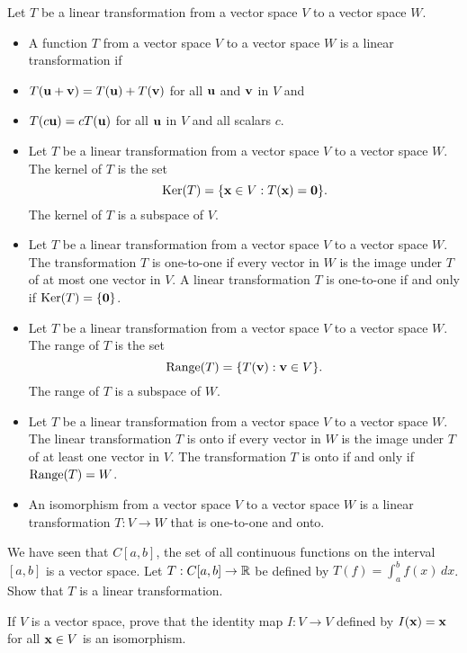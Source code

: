 \label{sec:lin_trans_summ}
Let $T$ be a linear transformation from a vector space $V$ to a vector space $W$. 
\begin{itemize}
\item A function $T$  from a vector space $V$ to a vector space $W$ is a linear transformation if 
	\be
	\item $T(\mathbf{u} + \mathbf{v}) = T(\mathbf{u}) + T(\mathbf{v})$ for all $\mathbf{u}$ and $\mathbf{v}$ in $V$ and
	\item $T(c\mathbf{u}) = cT(\mathbf{u})$ for all $\mathbf{u}$ in $V$ and all scalars $c$.
	\ee
\item Let $T$ be a linear transformation from a vector space $V$ to a vector space $W$. The kernel of $T$ is the set
\[\text{Ker}(T) = \{\mathbf{x} \in V : T(\mathbf{x}) = \mathbf{0}\}.\]
The kernel of $T$ is a subspace of $V$.
\item Let $T$ be a linear transformation from a vector space $V$ to a vector space $W$. The transformation $T$ is one-to-one if every vector in $W$ is the image under $T$ of at most one vector in $V$. A linear transformation $T$ is one-to-one if and only if $\text{Ker}(T) = \{\mathbf{0}\}$.
\item Let $T$ be a linear transformation from a vector space $V$ to a vector space $W$. The range of $T$ is the set 
\[\text{Range}(T) = \{T(\mathbf{v}) : \mathbf{v} \in V\}.\]
The range of $T$ is a subspace of $W$.
\item Let $T$ be a linear transformation from a vector space $V$ to a vector space $W$. The linear transformation $T$ is onto if every vector in $W$ is the image under $T$ of at least one vector in $V$. The transformation $T$ is onto if and only if $\text{Range}(T) = W$.
\item An isomorphism from a vector space $V$ to a vector space $W$ is a linear transformation $T : V \to W$ that is one-to-one and onto. 
\end{itemize}

\label{sec:lin_trans_exer}
\be

\item We have seen that $C[a,b]$, the set of all continuous functions on the interval $[a,b]$ is a vector space. Let $T : C[a,b] \to \mathbb{R}$ be defined by $T(f) = \int_a^b f(x) \, dx$. 
Show that $T$ is a linear transformation. 

\item \label{ex:8_a_reflexive_isomorphism}  If $V$ is a vector space, prove that the identity map $I:V \to V$ defined by $I(\mathbf{x}) = \mathbf{x}$ for all $\mathbf{x} \in V$ is an isomorphism.


